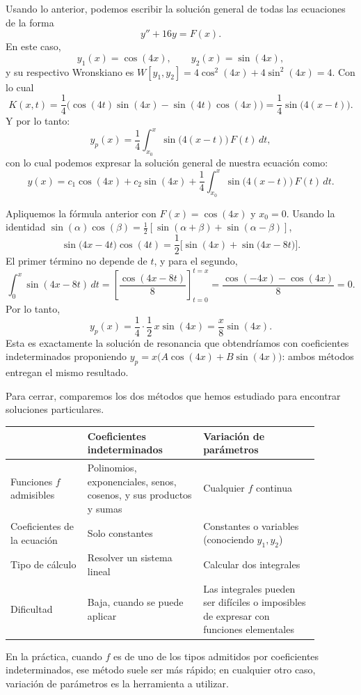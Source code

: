 \begin{example}
    Usando lo anterior, podemos escribir la soluci\'on general de todas las ecuaciones de la forma
    \[
    y''+16y=F(x).
    \]
    En este caso,
    \[
    y_1(x)=\cos(4x),\qquad y_2(x)=\sin(4x),
    \]
    y su respectivo Wronskiano es $W[y_1,y_2]=4\cos^2(4x)+4\sin^2(4x)=4$. Con lo cual
    \[
    K(x,t)=\dfrac{1}{4}\big(\cos(4t)\sin(4x)-\sin(4t)\cos(4x)\big)=\dfrac{1}{4}\sin\big(4(x-t)\big).
    \]
    Y por lo tanto:
    \[
    y_p(x)=\dfrac{1}{4}\int_{x_0}^x \sin\big(4(x-t)\big)\,F(t)\,dt,
    \]
    con lo cual podemos expresar la soluci\'on general de nuestra ecuaci\'on como:
    \[
    y(x)=c_1\cos(4x)+c_2\sin(4x)+\dfrac{1}{4}\int_{x_0}^x \sin\big(4(x-t)\big)\,F(t)\,dt.
    \]
\end{example}

\begin{example}
    Apliquemos la f\'ormula anterior con $F(x)=\cos(4x)$ y $x_0=0$. Usando la identidad $\sin(\alpha)\cos(\beta)=\frac{1}{2}\left[\sin(\alpha+\beta)+\sin(\alpha-\beta)\right]$,
    \[
    \sin\big(4x-4t\big)\cos(4t)=\dfrac{1}{2}\Big[\sin(4x)+\sin\big(4x-8t\big)\Big].
    \]
    El primer t\'ermino no depende de $t$, y para el segundo,
    \[
    \int_0^x\sin(4x-8t)\,dt=\left[\dfrac{\cos(4x-8t)}{8}\right]_{t=0}^{t=x}=\dfrac{\cos(-4x)-\cos(4x)}{8}=0.
    \]
    Por lo tanto,
    \[
    y_p(x)=\dfrac{1}{4}\cdot\dfrac{1}{2}\,x\sin(4x)=\dfrac{x}{8}\sin(4x).
    \]
    Esta es exactamente la soluci\'on de resonancia que obtendr\'iamos con coeficientes indeterminados proponiendo $y_p=x\big(A\cos(4x)+B\sin(4x)\big)$: ambos m\'etodos entregan el mismo resultado.
\end{example}

Para cerrar, comparemos los dos m\'etodos que hemos estudiado para encontrar soluciones particulares.

\begin{center}
\small\renewcommand{\arraystretch}{1.6}
\begin{tabular}{|>{\raggedright\arraybackslash}p{0.22\linewidth}|>{\raggedright\arraybackslash}p{0.33\linewidth}|>{\raggedright\arraybackslash}p{0.33\linewidth}|}
\hline
 & \textbf{Coeficientes indeterminados} & \textbf{Variaci\'on de par\'ametros} \\ \hline
Funciones $f$ admisibles & Polinomios, exponenciales, senos, cosenos, y sus productos y sumas & Cualquier $f$ continua \\ \hline
Coeficientes de la ecuaci\'on & Solo constantes & Constantes o variables (conociendo $y_1,y_2$) \\ \hline
Tipo de c\'alculo & Resolver un sistema lineal & Calcular dos integrales \\ \hline
Dificultad & Baja, cuando se puede aplicar & Las integrales pueden ser dif\'iciles o imposibles de expresar con funciones elementales \\ \hline
\end{tabular}
\end{center}

En la pr\'actica, cuando $f$ es de uno de los tipos admitidos por coeficientes indeterminados, ese m\'etodo suele ser m\'as r\'apido; en cualquier otro caso, variaci\'on de par\'ametros es la herramienta a utilizar.
